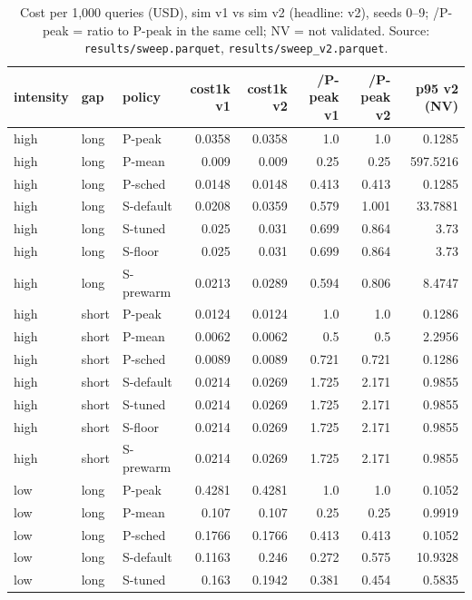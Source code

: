 \begin{table}[htbp]
\centering
\tiny\renewcommand{\arraystretch}{0.85}
\caption{Cost per 1,000 queries (USD), sim v1 vs sim v2 (headline: v2), seeds 0--9; /P-peak = ratio to P-peak in the same cell; NV = not validated. Source: \texttt{results/sweep.parquet}, \texttt{results/sweep\_v2.parquet}.}
\label{tab:costv1v2}
\setlength{\tabcolsep}{3pt}
\begin{tabular}{lllrrrrr}
\toprule
\textbf{intensity} & \textbf{gap} & \textbf{policy} & \textbf{cost1k v1} & \textbf{cost1k v2} & \textbf{/P-peak v1} & \textbf{/P-peak v2} & \textbf{p95 v2 (NV)} \\
\midrule
high & long & P-peak & 0.0358 & 0.0358 & 1.0 & 1.0 & 0.1285 \\
high & long & P-mean & 0.009 & 0.009 & 0.25 & 0.25 & 597.5216 \\
high & long & P-sched & 0.0148 & 0.0148 & 0.413 & 0.413 & 0.1285 \\
high & long & S-default & 0.0208 & 0.0359 & 0.579 & 1.001 & 33.7881 \\
high & long & S-tuned & 0.025 & 0.031 & 0.699 & 0.864 & 3.73 \\
high & long & S-floor & 0.025 & 0.031 & 0.699 & 0.864 & 3.73 \\
high & long & S-prewarm & 0.0213 & 0.0289 & 0.594 & 0.806 & 8.4747 \\
high & short & P-peak & 0.0124 & 0.0124 & 1.0 & 1.0 & 0.1286 \\
high & short & P-mean & 0.0062 & 0.0062 & 0.5 & 0.5 & 2.2956 \\
high & short & P-sched & 0.0089 & 0.0089 & 0.721 & 0.721 & 0.1286 \\
high & short & S-default & 0.0214 & 0.0269 & 1.725 & 2.171 & 0.9855 \\
high & short & S-tuned & 0.0214 & 0.0269 & 1.725 & 2.171 & 0.9855 \\
high & short & S-floor & 0.0214 & 0.0269 & 1.725 & 2.171 & 0.9855 \\
high & short & S-prewarm & 0.0214 & 0.0269 & 1.725 & 2.171 & 0.9855 \\
low & long & P-peak & 0.4281 & 0.4281 & 1.0 & 1.0 & 0.1052 \\
low & long & P-mean & 0.107 & 0.107 & 0.25 & 0.25 & 0.9919 \\
low & long & P-sched & 0.1766 & 0.1766 & 0.413 & 0.413 & 0.1052 \\
low & long & S-default & 0.1163 & 0.246 & 0.272 & 0.575 & 10.9328 \\
low & long & S-tuned & 0.163 & 0.1942 & 0.381 & 0.454 & 0.5835 \\

\end{tabular}
\end{table}
